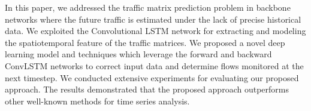 In this paper, we addressed the traffic matrix prediction problem in backbone networks where the future traffic is estimated under the lack of precise historical data. We exploited the Convolutional LSTM network for extracting and modeling the spatiotemporal feature of the traffic matrices. We proposed a novel deep learning model and techniques which leverage the forward and backward ConvLSTM networks to correct input data and determine flows monitored at the next timestep. We conducted extensive experiments for evaluating our proposed approach. The results demonstrated that the proposed approach outperforms other well-known methods for time series analysis. 

